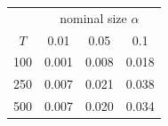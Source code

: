 % 
\begin{tabular}{cccc}
  \hline
  & \multicolumn{3}{c}{nominal size $\alpha$} \\
 $T$ & 0.01 & 0.05 & 0.1 \\
 \hline
100 & 0.001 & 0.008 & 0.018 \\ 
  250 & 0.007 & 0.021 & 0.038 \\ 
  500 & 0.007 & 0.020 & 0.034 \\ 
   \hline
\end{tabular}
